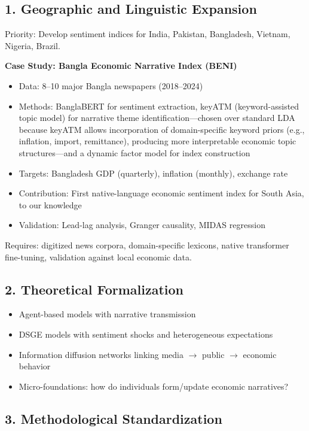 \documentclass[11pt]{article}
\begin{document}
\subsection{1. Geographic and Linguistic Expansion}

Priority: Develop sentiment indices for India, Pakistan, Bangladesh, Vietnam, Nigeria, Brazil.

\textbf{Case Study: Bangla Economic Narrative Index (BENI)}
\begin{itemize}
\item Data: 8--10 major Bangla newspapers (2018--2024)
\item Methods: BanglaBERT for sentiment extraction, keyATM (keyword-assisted topic model) for narrative theme identification---chosen over standard LDA because keyATM allows incorporation of domain-specific keyword priors (e.g., inflation, import, remittance), producing more interpretable economic topic structures---and a dynamic factor model for index construction
\item Targets: Bangladesh GDP (quarterly), inflation (monthly), exchange rate
\item Contribution: First native-language economic sentiment index for South Asia, to our knowledge
\item Validation: Lead-lag analysis, Granger causality, MIDAS regression
\end{itemize}

Requires: digitized news corpora, domain-specific lexicons, native transformer fine-tuning, validation against local economic data.

\subsection{2. Theoretical Formalization}

\begin{itemize}
\item Agent-based models with narrative transmission
\item DSGE models with sentiment shocks and heterogeneous expectations  
\item Information diffusion networks linking media $\to$ public $\to$ economic behavior
\item Micro-foundations: how do individuals form/update economic narratives?
\end{itemize}

\subsection{3. Methodological Standardization}
\end{document}
